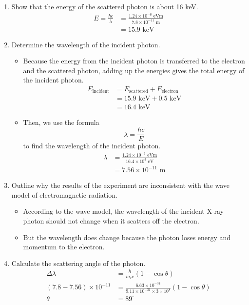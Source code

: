 \documentclass[a4paper,12pt]{article}
\newcommand{\degsym}{^{\circ}}
\begin{document}
\begin{enumerate}[label=(\alph*)]
  \item Show that the energy of the scattered photon is about 16 keV.
        \begin{align*}
          E = \frac{hc}{\lambda} & = \frac{1.24\times 10^{-6}\text{ eVm}}{7.8\times 10^{-11}\text{ m}} \\
                                 & = 15.9 \text{ keV}
        \end{align*}
  \item Determine the wavelength of the incident photon.
        \begin{itemize}
          \item Because the energy from the incident photon is transferred to the electron and the scattered photon, adding up the energies gives the total energy of the incident photon.
                \begin{align*}
                  E_{\text{incident}} & = E_{\text{scattered}} + E_{\text{electron}} \\
                                      & = 15.9 \text{ keV} + 0.5 \text{ keV}         \\
                                      & = 16.4 \text{ keV}
                \end{align*}
          \item Then, we use the formula $$\lambda = \frac{hc}{E}$$ to find the wavelength of the incident photon.
                \begin{align*}
                  \lambda & = \frac{1.24\times 10^{-6}\text{ eVm}}{16.4\times 10^3\text{ eV}} \\
                          & = 7.56\times 10^{-11}\text{ m}
                \end{align*}
        \end{itemize}
  \item Outline why the results of the experiment are inconsistent with the wave model of electromagnetic radiation.
        \begin{itemize}
          \item According to the wave model, the wavelength of the incident X-ray photon should not change when it scatters off the electron.
          \item But the wavelength does change because the photon loses energy and momentum to the electron.
        \end{itemize}
  \item Calculate the scattering angle of the photon.
        \begin{align*}
          \Delta \lambda              & = \frac{h}{m_ec}(1-\cos\theta)                                                     \\
          (7.8 - 7.56)\times 10^{-11} & = \frac{6.63\times 10^{-34}}{9.11\times 10^{-31}\times 3\times 10^8}(1-\cos\theta) \\
          \theta                      & = 89\degsym
        \end{align*}

\end{enumerate}
\end{document}
